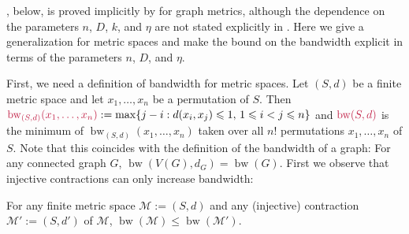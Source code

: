 \documentclass{patmorin}
\makeatletter
\renewcommand{\le}{\leqslant}
\newcommand{\david}[1]{{\color{orange} David: #1}}
\newcommand{\pat}[1]{\textcolor{Maroon}{Pat: #1}}
\def\mathcolor#1#{\@mathcolor{#1}}
\def\@mathcolor#1#2#3{%
  \protect\leavevmode
  \begingroup
    \color#1{#2}#3%
  \endgroup
}
\newcommand{\mathdefin}[1]{\mathcolor{brightmaroon}{#1}}
\DeclareMathOperator{\bw}{bw}
\makeatother
\begin{document}
, below, is proved implicitly by \citet{feige:approximating} for graph metrics, although the dependence on the parameters $n$, $D$, $k$, and $\eta$ are not stated explicitly in \cite{feige:approximating}. Here we give a generalization for metric spaces and make the bound on the bandwidth explicit in terms of the parameters $n$, $D$, and $\eta$.

First, we need a definition of bandwidth for metric spaces.  Let $(S,d)$ be a finite metric space and let $x_1,\ldots,x_n$ be a permutation of $S$.  Then $\mathdefin{\bw_{(S,d)}(x_1,\ldots,x_n)}:=\max\{j-i:d(x_i,x_j)\le 1,\, 1\le i <j\le n\}$ and $\mathdefin{\bw(S,d)}$ is the minimum of $\bw_{(S,d)}(x_1,\ldots,x_n)$ taken over all $n!$ permutations $x_1,\ldots,x_n$ of $S$.  Note that this coincides with the definition of the bandwidth of a graph: For any connected graph $G$, $\bw(V(G),d_G)=\bw(G)$.  First we observe that injective
contractions can only increase bandwidth:


\begin{obs}\label{contraction_increases_bandwidth}
  For any finite metric space $\mathcal{M}:=(S,d)$ and any (injective) contraction $\mathcal{M}':=(S,d')$ of $\mathcal{M}$, $\bw(\mathcal{M}) \le \bw(\mathcal{M}')$.
\end{obs}
\end{document}
